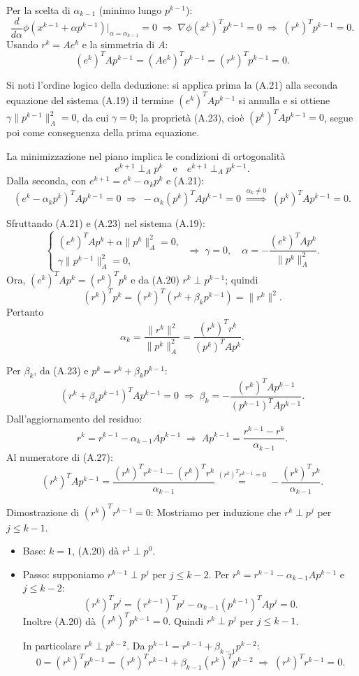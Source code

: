 \documentclass[a4paper,12pt]{article}
\numberwithin{equation}{section}
\numberwithin{figure}{section}
\numberwithin{table}{section}
\begin{document}
Per la scelta di \(\alpha_{k-1}\) (minimo lungo \(p^{k-1}\)):
\[
\frac{d}{d\alpha}\phi(x^{k-1}+\alpha p^{k-1})\big|_{\alpha=\alpha_{k-1}}=0
\;\Longrightarrow\;
\nabla\phi(x^k)^T p^{k-1}=0
\;\Longrightarrow\;
(r^k)^T p^{k-1}=0. \tag{A.20}
\]
Usando \(r^k=Ae^k\) e la simmetria di \(A\):
\[
(e^k)^T A p^{k-1}=(Ae^k)^T p^{k-1}=(r^k)^T p^{k-1}=0. \tag{A.21}
\]

Si noti l'ordine logico della deduzione: si applica prima la (A.21) alla seconda equazione del sistema (A.19) il termine $(e^k)^T A p^{k-1}$ si annulla e si ottiene \(\gamma\|p^{k-1}\|_A^2 = 0\), da cui \(\gamma = 0\); la proprietà (A.23), cioè \((p^k)^T A p^{k-1} = 0\), segue poi come conseguenza della prima equazione.

La minimizzazione nel piano implica le condizioni di ortogonalità
\[
e^{k+1} \perp_A p^k \quad \text{e} \quad e^{k+1} \perp_A p^{k-1}. \tag{A.22}
\]
Dalla seconda, con \(e^{k+1}=e^k-\alpha_k p^k\) e (A.21):
\[
(e^k-\alpha_k p^k)^T A p^{k-1}=0
\;\Longrightarrow\;
-\alpha_k (p^k)^T A p^{k-1}=0
\;\overset{\alpha_k\neq0}{\Longrightarrow}\;
(p^k)^T A p^{k-1}=0. \tag{A.23}
\]

Sfruttando (A.21) e (A.23) nel sistema (A.19):
\[
\begin{cases}
(e^k)^T A p^k+\alpha\|p^k\|_A^2=0,\\
\gamma\|p^{k-1}\|_A^2=0,
\end{cases}
\;\Longrightarrow\;
\gamma=0,\quad
\alpha=-\frac{(e^k)^T A p^k}{\|p^k\|_A^2}. \tag{A.24}
\]
Ora, \((e^k)^T A p^k=(r^k)^T p^k\) e da (A.20) \(r^k\perp p^{k-1}\); quindi
\[
(r^k)^T p^k=(r^k)^T(r^k+\beta_k p^{k-1})=\|r^k\|^2. \tag{A.25}
\]
Pertanto
\[
\alpha_k=\frac{\|r^k\|^2}{\|p^k\|_A^2}
=\frac{(r^k)^T r^k}{(p^k)^T A p^k}. \tag{A.26}
\]

Per \(\beta_k\), da (A.23) e \(p^k=r^k+\beta_k p^{k-1}\):
\[
(r^k+\beta_k p^{k-1})^T A p^{k-1}=0
\;\Longrightarrow\;
\beta_k=-\frac{(r^k)^T A p^{k-1}}{(p^{k-1})^T A p^{k-1}}. \tag{A.27}
\]
Dall'aggiornamento del residuo:
\[
r^k=r^{k-1}-\alpha_{k-1}A p^{k-1}
\;\Longrightarrow\;
A p^{k-1}=\frac{r^{k-1}-r^k}{\alpha_{k-1}}. \tag{A.28}
\]
Al numeratore di (A.27):
\[
(r^k)^T A p^{k-1}
=\frac{(r^k)^T r^{k-1}-(r^k)^T r^k}{\alpha_{k-1}}
\overset{(r^k)^T r^{k-1}=0}{=}
-\frac{(r^k)^T r^k}{\alpha_{k-1}}. \tag{A.29}
\]

Dimostrazione di \((r^k)^T r^{k-1}=0\):  
Mostriamo per induzione che \(r^k\perp p^j\) per \(j\le k-1\).
\begin{itemize}
\item Base: \(k=1\), (A.20) dà \(r^1\perp p^0\).
\item Passo: supponiamo \(r^{k-1}\perp p^j\) per \(j\le k-2\). Per \(r^k=r^{k-1}-\alpha_{k-1}A p^{k-1}\) e \(j\le k-2\):
\[
(r^k)^T p^j=(r^{k-1})^T p^j-\alpha_{k-1}(p^{k-1})^T A p^j=0.
\]
Inoltre (A.20) dà \((r^k)^T p^{k-1}=0\). Quindi \(r^k\perp p^j\) per \(j\le k-1\).

In particolare \(r^k\perp p^{k-2}\). Da \(p^{k-1}=r^{k-1}+\beta_{k-1}p^{k-2}\):
\[
0=(r^k)^T p^{k-1}=(r^k)^T r^{k-1}+\beta_{k-1}(r^k)^T p^{k-2}
\;\Longrightarrow\;
(r^k)^T r^{k-1}=0. \tag{A.30}
\]
\end{itemize}
\end{document}
